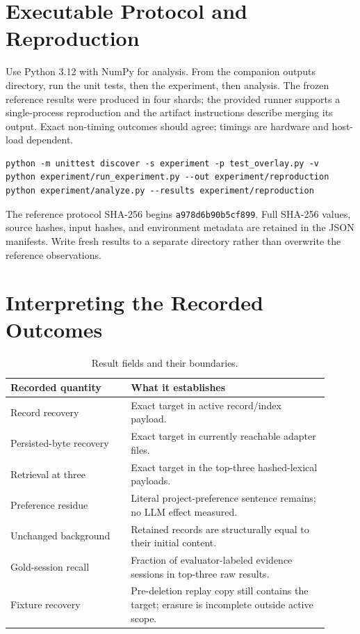 ﻿\documentclass[sigconf,nonacm]{acmart}
\begin{document}
\appendix
\section{Executable Protocol and Reproduction}
Use Python 3.12 with NumPy for analysis. From the companion outputs directory, run the unit tests, then the experiment, then analysis. The frozen reference results were produced in four shards; the provided runner supports a single-process reproduction and the artifact instructions describe merging its output. Exact non-timing outcomes should agree; timings are hardware and host-load dependent.

\begin{Verbatim}[fontsize=\footnotesize,breaklines=true,breakanywhere=true]
python -m unittest discover -s experiment -p test_overlay.py -v
python experiment/run_experiment.py --out experiment/reproduction
python experiment/analyze.py --results experiment/reproduction
\end{Verbatim}
The reference protocol SHA-256 begins \texttt{a978d6b90b5cf899}. Full SHA-256 values, source hashes, input hashes, and environment metadata are retained in the JSON manifests. Write fresh results to a separate directory rather than overwrite the reference observations.

\section{Interpreting the Recorded Outcomes}
\begin{table}[h]
\caption{Result fields and their boundaries.}
\begin{tabular}{>{\raggedright\arraybackslash}p{0.34\linewidth}>{\raggedright\arraybackslash}p{0.57\linewidth}}
\toprule
Recorded quantity & What it establishes \\
\midrule
Record recovery & Exact target in active record/index payload. \\
Persisted-byte recovery & Exact target in currently reachable adapter files. \\
Retrieval at three & Exact target in the top-three hashed-lexical payloads. \\
Preference residue & Literal project-preference sentence remains; no LLM effect measured. \\
Unchanged background & Retained records are structurally equal to their initial content. \\
Gold-session recall & Fraction of evaluator-labeled evidence sessions in top-three raw results. \\
Fixture recovery & Pre-deletion replay copy still contains the target; erasure is incomplete outside active scope. \\
\bottomrule
\end{tabular}
\end{table}
\end{document}
